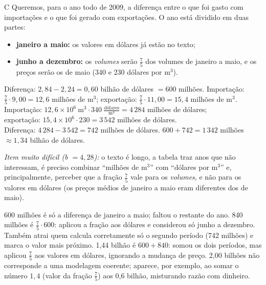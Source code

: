 \begin{resolucao}{C}
 Queremos, para o ano todo de 2009, a diferença entre o que foi
gasto com importações e o que foi gerado com exportações. O ano está dividido em duas partes:
\begin{itemize}[leftmargin=1.4em,itemsep=1pt,topsep=2pt]
  \item \textbf{janeiro a maio:} os valores em dólares já estão no texto;
  \item \textbf{junho a dezembro:} os \emph{volumes} serão $\frac{7}{5}$ dos volumes de janeiro a maio,
        e os preços serão os de maio (340 e 230 dólares por m$^3$).
\end{itemize}
 Diferença: $2,84-2,24=0,60$ bilhão de dólares $=600$ milhões.
Importação: $\frac{7}{5}\cdot 9,00=12,6$ milhões de m$^3$; \quad
exportação: $\frac{7}{5}\cdot 11,00=15,4$ milhões de m$^3$.
Importação: $12,6\times 10^6\ \text{m}^3\cdot 340\ \tfrac{\text{dólares}}{\text{m}^3}=4\,284$ milhões de dólares;\\
exportação: $15,4\times 10^6\cdot 230=3\,542$ milhões de dólares.\\
Diferença: $4\,284-3\,542=742$ milhões de dólares.
 $600+742=1\,342$ milhões $\approx 1,34$ bilhão de dólares.

\textit{Item muito difícil (b $=4,28$):} o texto é longo, a tabela traz anos que não interessam, é
preciso combinar ``milhões de m$^3$'' com ``dólares por m$^3$'' e, principalmente, perceber que a
fração $\frac{7}{5}$ vale para os \emph{volumes}, e não para os valores em dólares (os preços médios
de janeiro a maio eram diferentes dos de maio).
\begin{distratores}
 600 milhões é só a diferença de janeiro a maio; faltou o restante do ano.
 840 milhões é $\frac{7}{5}\cdot 600$: aplicou a fração aos dólares e considerou só junho a
dezembro. Também atrai quem calcula corretamente só o segundo período (742 milhões) e marca o valor
mais próximo.
 1,44 bilhão é $600+840$: somou os dois períodos, mas aplicou $\frac{7}{5}$ aos valores em
dólares, ignorando a mudança de preço.
 2,00 bilhões não corresponde a uma modelagem coerente; aparece, por exemplo, ao somar o
número $1,4$ (valor da fração $\frac{7}{5}$) aos 0,6 bilhão, misturando razão com dinheiro.
\end{distratores}
\end{resolucao}

